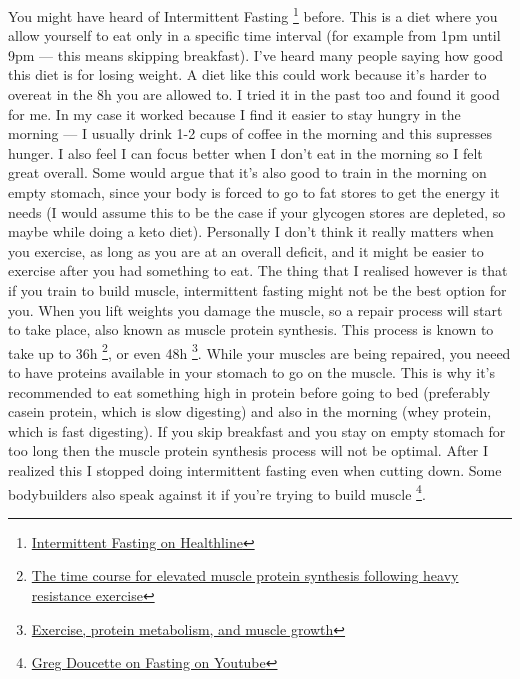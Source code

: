 \documentclass[openany, 12pt]{book}
\begin{document}
        You might have heard of Intermittent Fasting
        \footnote{\href{https://www.healthline.com/nutrition/intermittent-fasting-guide}{Intermittent Fasting on Healthline}}
        before. This is a diet where you allow yourself to eat only in a specific time interval (for example from 1pm until 9pm --- this means skipping breakfast).
        I've heard many people saying how good this diet is for losing weight. A diet like this could work because it's harder to overeat in the 8h you are allowed to.
        I tried it in the past too and found it good for me. In my case it worked because I find it easier to stay hungry in the morning --- I usually drink 1-2 cups of coffee
        in the morning and this supresses hunger. I also feel I can focus better when I don't eat in the morning so I felt great overall. Some would argue that it's also good
        to train in the morning on empty stomach, since your body is forced to go to fat stores to get the energy it needs (I would assume this to be the case if your glycogen
        stores are depleted, so maybe while doing a keto diet). Personally I don't think it really matters when you exercise, as long as you are at an overall deficit, and it
        might be easier to exercise after you had something to eat. The thing that I realised however is that if you train to build muscle, intermittent fasting might
        not be the best option for you. When you lift weights you damage the muscle, so a repair process will start to take place, also known as muscle protein synthesis.
        This process is known to take up to 36h
        \footnote{\href{https://pubmed.ncbi.nlm.nih.gov/8563679/}{The time course for elevated muscle protein synthesis following heavy resistance exercise}}, or even 48h
        \footnote{\href{https://pubmed.ncbi.nlm.nih.gov/11255140/}{Exercise, protein metabolism, and muscle growth}}. While your muscles are being repaired, you
        neeed to have proteins available in your stomach to go on the muscle. This is why it's recommended to eat something high in protein before going to bed (preferably casein
        protein, which is slow digesting) and also in the morning (whey protein, which is fast digesting). If you skip breakfast and you stay on empty stomach for too long
        then the muscle protein synthesis process will not be optimal. After I realized this I stopped doing intermittent fasting even when cutting down. Some bodybuilders
        also speak against it if you're trying to build muscle
        \footnote{\href{https://www.youtube.com/watch?v=cMZ8Ijq-6Do}{Greg Doucette on Fasting on Youtube}}.
\end{document}
